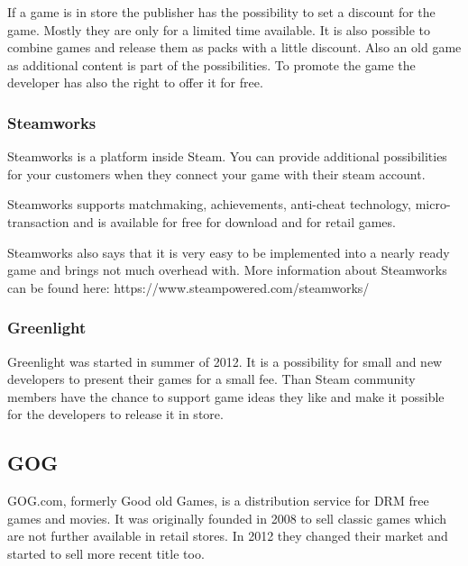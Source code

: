 If a game is in store the publisher has the possibility to set a discount for the game. Mostly they are only for a limited time available. It is also possible to combine games and release them as packs with a little discount. Also an old game as additional content is part of the possibilities. To promote the game the developer has also the right to offer it for free.

\subsubsection{Steamworks}
\label{subsec:steam_steamworks}
Steamworks is a platform inside Steam. You can provide additional possibilities for your customers when they connect your game with their steam account. \citep{valve_steamworks_2016}

Steamworks supports matchmaking, achievements, anti-cheat technology, micro-transaction and is available for free for download and for retail games.

Steamworks also says that it is very easy to be implemented into a nearly ready game and brings not much overhead with.
More information about Steamworks can be found here: https://www.steampowered.com/steamworks/

\subsubsection{Greenlight}
\label{subsec:steam_greenlight}
Greenlight was started in summer of 2012. It is a possibility for small and new developers to present their games for a small fee. Than Steam community members have the chance to support game ideas they like and make it possible for the developers to release it in store.


\subsection{GOG}
\label{subsec:gog}
GOG.com, formerly Good old Games, is a distribution service for DRM free games and movies. It was originally founded in 2008 to sell classic games which are not further available in retail stores. In 2012 they changed their market and started to sell more recent title too.

